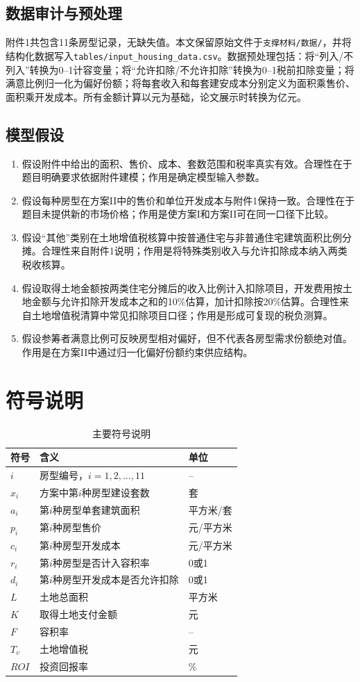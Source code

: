 \documentclass[UTF8,12pt,a4paper]{ctexart}
\begin{document}
\subsection{数据审计与预处理}
附件1共包含11条房型记录，无缺失值。本文保留原始文件于\texttt{支撑材料/数据/}，并将结构化数据写入\texttt{tables/input\_housing\_data.csv}。数据预处理包括：将“列入/不列入”转换为0--1计容变量；将“允许扣除/不允许扣除”转换为0--1税前扣除变量；将满意比例归一化为偏好份额；将每套收入和每套建安成本分别定义为面积乘售价、面积乘开发成本。所有金额计算以元为基础，论文展示时转换为亿元。

\subsection{模型假设}
\begin{enumerate}
\item 假设附件中给出的面积、售价、成本、套数范围和税率真实有效。合理性在于题目明确要求依据附件建模；作用是确定模型输入参数。
\item 假设每种房型在方案II中的售价和单位开发成本与附件1保持一致。合理性在于题目未提供新的市场价格；作用是使方案I和方案II可在同一口径下比较。
\item 假设“其他”类别在土地增值税核算中按普通住宅与非普通住宅建筑面积比例分摊。合理性来自附件1说明；作用是将特殊类别收入与允许扣除成本纳入两类税收核算。
\item 假设取得土地金额按两类住宅分摊后的收入比例计入扣除项目，开发费用按土地金额与允许扣除开发成本之和的10\%估算，加计扣除按20\%估算。合理性来自土地增值税清算中常见扣除项目口径；作用是形成可复现的税负测算。
\item 假设参筹者满意比例可反映房型相对偏好，但不代表各房型需求份额绝对值。作用是在方案II中通过归一化偏好份额约束供应结构。
\end{enumerate}

\section{符号说明}
\begin{table}[H]\centering\caption{主要符号说明}\label{tab:symbol}
\begin{tabular}{p{2cm}p{9cm}p{3cm}}\toprule
符号 & 含义 & 单位\\\midrule
$i$ & 房型编号，$i=1,2,\ldots,11$ & --\\
$x_i$ & 方案中第$i$种房型建设套数 & 套\\
$a_i$ & 第$i$种房型单套建筑面积 & 平方米/套\\
$p_i$ & 第$i$种房型售价 & 元/平方米\\
$c_i$ & 第$i$种房型开发成本 & 元/平方米\\
$r_i$ & 第$i$种房型是否计入容积率 & 0或1\\
$d_i$ & 第$i$种房型开发成本是否允许扣除 & 0或1\\
$L$ & 土地总面积 & 平方米\\
$K$ & 取得土地支付金额 & 元\\
$F$ & 容积率 & --\\
$T_v$ & 土地增值税 & 元\\
$ROI$ & 投资回报率 & \%\\\bottomrule
\end{tabular}\end{table}
\end{document}
